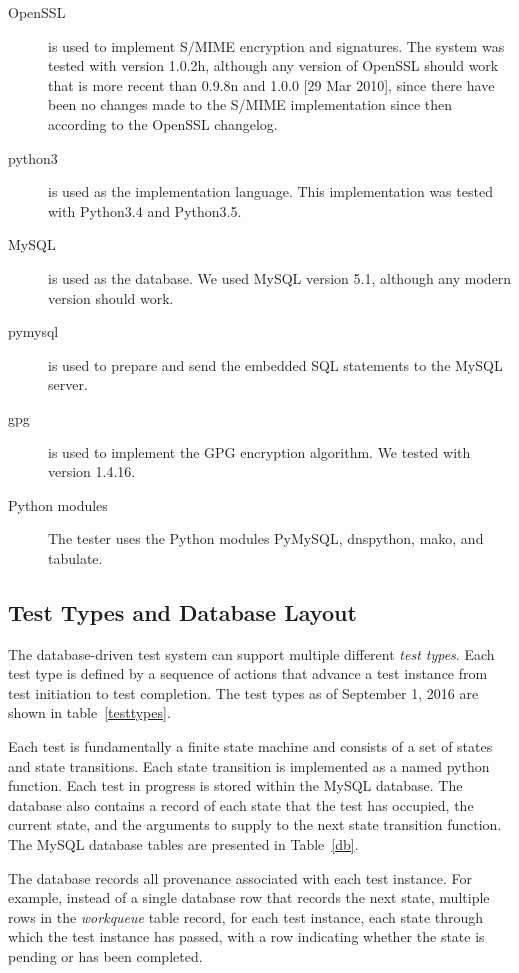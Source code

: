 \documentclass[preprint,3p,11pt]{elsarticle}
\begin{document}
\begin{description}
\item[OpenSSL] is used to implement S/MIME encryption and
signatures. The system was tested with version 1.0.2h, although any
version of OpenSSL should work that is more recent than 0.9.8n and
1.0.0 [29 Mar 2010], since there have been no changes made to the
S/MIME implementation since then according to the OpenSSL changelog. 

\item[python3] is used as the implementation language. This
implementation was tested with Python3.4 and Python3.5. 

\item[MySQL] is used as the database. We used MySQL version 5.1,
although any modern version should work. 

\item[pymysql] is used to prepare and send the embedded SQL
statements to the MySQL server.

\item[gpg] is used to implement the GPG encryption
algorithm. We tested with version 1.4.16.

\item[Python modules] The tester uses the Python modules PyMySQL,
dnspython, mako, and tabulate.
\end{description}

\subsection{Test Types and Database Layout}
The database-driven test system can support multiple different
\emph{test types}. Each test type is defined by a sequence of actions
that advance a test instance from test initiation to test
completion. The test types as of September 1, 2016 are shown in
table~\ref{testtypes}. 

Each test is fundamentally a finite state machine and consists of a
set of states and state transitions. Each state transition is
implemented as a named python function. Each test in progress is
stored within the MySQL database. The database also contains a record
of each state that the test has occupied, the current state, and the
arguments to supply to the next state transition function. The MySQL
database tables are presented in Table~\ref{db}. 

The database records all provenance associated with each test
instance. For example, instead of a single database row that records
the next state, multiple rows in the \emph{workqueue} table record,
for each test instance, each state through which the test instance has
passed, with a row indicating whether the state is pending or has been
completed. 
\end{document}
